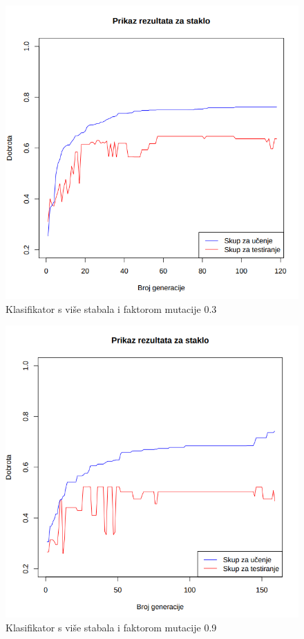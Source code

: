 \documentclass[times, utf8, zavrsni]{fer}
\begin{document}
\begin{figure}[H]
\centering
\includegraphics[scale=0.45]{grafovi/staklo2-3}
\caption{Klasifikator s više stabala i faktorom mutacije 0.3}
\end{figure}

\begin{figure}[H]
\centering
\includegraphics[scale=0.45]{grafovi/staklo2-9}
\caption{Klasifikator s više stabala i faktorom mutacije 0.9}
\end{figure}
\end{document}
